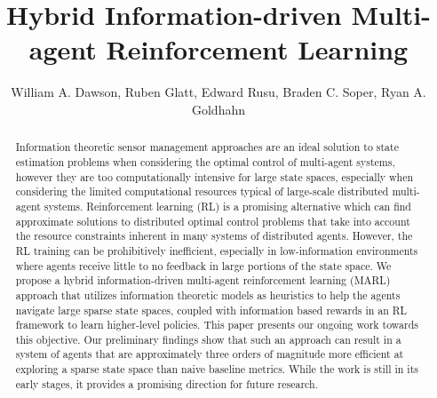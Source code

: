 \documentclass[letterpaper]{article} %
\title{Hybrid Information-driven Multi-agent Reinforcement Learning}
\author{
    William A. Dawson,
    Ruben Glatt,
    Edward Rusu,
    Braden C. Soper,
    Ryan A. Goldhahn
    \\
}
\begin{document}
\maketitle

\begin{abstract}
Information theoretic sensor management approaches are an ideal solution to state estimation problems when considering the optimal control of multi-agent systems, however they are too computationally intensive for large state spaces, especially when considering the limited computational resources typical of large-scale distributed multi-agent systems.
Reinforcement learning (RL) is a promising alternative which can find approximate solutions to distributed optimal control problems that take into account the resource constraints inherent in many systems of distributed agents.
However, the RL training can be prohibitively inefficient, especially in low-information environments where agents receive little to no feedback in large portions of the state space.
We propose a hybrid information-driven multi-agent reinforcement learning (MARL) approach that utilizes information theoretic models as heuristics to help the agents navigate large sparse state spaces, coupled with information based rewards in an RL framework to learn higher-level policies.
This paper presents our ongoing work towards this objective.
Our preliminary findings show that such an approach can result in a system of agents that are approximately three orders of magnitude more efficient at exploring a sparse state space than naive baseline metrics.
While the work is still in its early stages, it provides a promising direction for future research.
\end{abstract}
\end{document}
